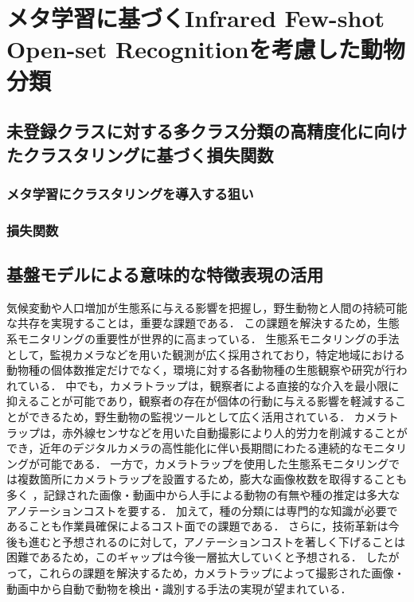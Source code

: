 \documentclass[a4paper,11pt,nomag]{jsreport}
\begin{document}
\setcounter{chapter}{3}

\chapter*{メタ学習に基づくInfrared Few-shot Open-set Recognitionを考慮した動物分類}

\section{未登録クラスに対する多クラス分類の高精度化に向けたクラスタリングに基づく損失関数}

\subsection{メタ学習にクラスタリングを導入する狙い}



\subsection{損失関数}



\section{基盤モデルによる意味的な特徴表現の活用}

気候変動や人口増加が生態系に与える影響を把握し，野生動物と人間の持続可能な共存を実現することは，重要な課題である．
この課題を解決するため，生態系モニタリングの重要性が世界的に高まっている\cite{zwerts2021, bandaru2024}．
生態系モニタリングの手法として，監視カメラなどを用いた観測が広く採用されており，特定地域における動物種の個体数推定だけでなく，環境に対する各動物種の生態観察や研究が行われている\cite{trolliet2014}．
中でも，カメラトラップは，観察者による直接的な介入を最小限に抑えることが可能であり，観察者の存在が個体の行動に与える影響を軽減することができるため，野生動物の監視ツールとして広く活用されている\cite{本郷2018, abood2023}．
カメラトラップは，赤外線センサなどを用いた自動撮影により人的労力を削減することができ，近年のデジタルカメラの高性能化に伴い長期間にわたる連続的なモニタリングが可能である．
一方で，カメラトラップを使用した生態系モニタリングでは複数箇所にカメラトラップを設置するため，膨大な画像枚数を取得することも多く \cite{kays2020, si2014}，記録された画像・動画中から人手による動物の有無や種の推定は多大なアノテーションコストを要する\cite{thangaraj2023}．
加えて，種の分類には専門的な知識が必要であることも作業員確保によるコスト面での課題である．
さらに，技術革新は今後も進むと予想されるのに対して，アノテーションコストを著しく下げることは困難であるため，このギャップは今後一層拡大していくと予想される\cite{安藤2019}．
したがって，これらの課題を解決するため，カメラトラップによって撮影された画像・動画中から自動で動物を検出・識別する手法の実現が望まれている．
\end{document}
